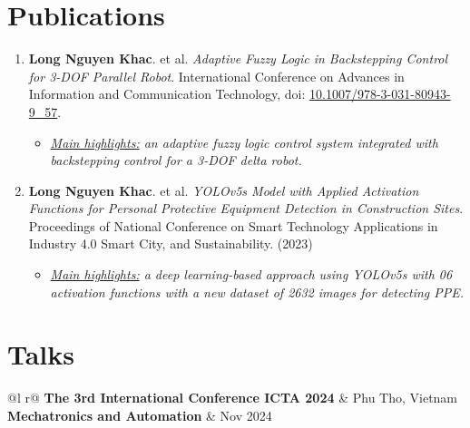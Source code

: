 \documentclass[a4paper,11pt]{article}
\begin{document}
\section{Publications}
\begin{enumerate}
    \item \textbf{Long Nguyen Khac}. et al. \textit{Adaptive Fuzzy Logic in Backstepping Control for 3-DOF Parallel Robot}. International Conference on Advances in Information and Communication Technology, doi: \href{https://doi.org/10.1007/978-3-031-80943-9_57}{10.1007/978-3-031-80943-9\_57}.
    \begin{itemize}
        \item \textit{\underline{Main highlights:} an adaptive fuzzy logic control system integrated with backstepping control for a 3-DOF delta robot.}
    \end{itemize}
    \item \textbf{Long Nguyen Khac}. et al. \textit{YOLOv5s Model with Applied Activation Functions for Personal Protective Equipment Detection in Construction Sites}. Proceedings of National Conference on Smart Technology Applications in Industry 4.0 Smart City, and Sustainability. (2023)
    \begin{itemize}
        \item \textit{\underline{Main highlights:} a deep learning-based approach using YOLOv5s with 06 activation functions with a new dataset of 2632 images for detecting PPE.}
    \end{itemize}
\end{enumerate}
\section{Talks}
\begin{tabularx}{\linewidth}{ @{}l r@{} }
\textbf{The 3rd International Conference ICTA 2024} & \hfill Phu Tho, Vietnam \\[3.75pt]
\textbf{Mechatronics and Automation} & \hfill Nov 2024 \\[3.75pt]
\end{tabularx}

\vspace{-0.4cm}
\end{document}
